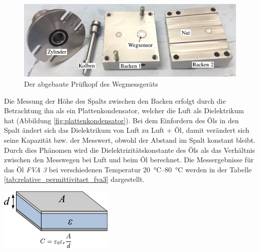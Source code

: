 \begin{figure}[htb]
    \centering
    \includegraphics[]{./images/wegmessgeraet_pruefkopf.pdf}
    \caption{Der abgebaute Prüfkopf des Wegmessgeräts}
    \label{fig:wegmessgeraet_pruefkopf}
\end{figure}

Die Messung der Höhe des Spalts zwischen den Backen erfolgt durch die Betrachtung ihn als ein Plattenkondensator, welcher die Luft als Dielektrikum hat (Abbildung \ref{fig:plattenkondensator}).
Bei dem Einfordern des Öls in den Spalt ändert sich das Dielektrikum von Luft zu Luft + Öl, damit verändert sich seine Kapazität bzw. der Messwert, obwohl der Abstand im Spalt konstant bleibt.
Durch dies Phänomen wird die Dielektrizitätskonstante des Öls als das Verhältnis zwischen den Messwegen bei Luft und beim Öl berechnet.
Die Messergebnisse für das Öl \textit{FVA 3} bei verschiedenen Temperatur \SIrange{20}{80}{\degreeCelsius} werden in der Tabelle \ref{tab:relative_permittivitaet_fva3} dargestellt.

\begin{minipage}[b]{0.55\linewidth}
    \centering
    
    \label{tab:relative_permittivitaet_fva3}
\end{minipage}
\hspace{0.5cm}
%
\begin{minipage}[b]{0.3\linewidth}
    \centering
    \includegraphics[width=\textwidth]{./images/plattenkondensator.pdf}
    \label{fig:plattenkondensator}
\end{minipage}


